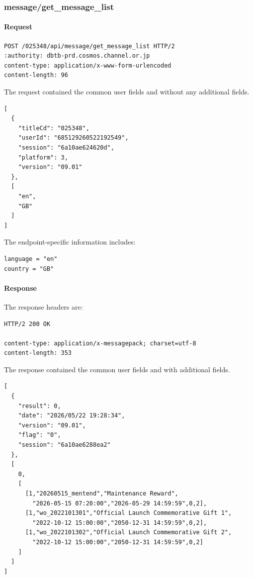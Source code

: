 \subsubsection{message/get\_message\_list}
\label{subsec:api_message_get_message_list}

\paragraph{Request}

\begin{lstlisting}
POST /025348/api/message/get_message_list HTTP/2
:authority: dbtb-prd.cosmos.channel.or.jp
content-type: application/x-www-form-urlencoded
content-length: 96
\end{lstlisting}

The request contained the common user fields and without any additional fields.

\begin{lstlisting}
[
  {
    "titleCd": "025348",
    "userId": "685129260522192549",
    "session": "6a10ae624620d",
    "platform": 3,
    "version": "09.01"
  },
  [
    "en",
    "GB"
  ]
]
\end{lstlisting}

The endpoint-specific information includes:

\begin{lstlisting}
language = "en"
country = "GB"
\end{lstlisting}

\newpage

\paragraph{Response}

The response headers are:

\begin{lstlisting}
HTTP/2 200 OK

content-type: application/x-messagepack; charset=utf-8
content-length: 353
\end{lstlisting}

The response contained the common user fields and with additional fields.

\begin{lstlisting}
[
  {
    "result": 0,
    "date": "2026/05/22 19:28:34",
    "version": "09.01",
    "flag": "0",
    "session": "6a10ae6288ea2"
  },
  [
    0,
    [
      [1,"20260515_mentend","Maintenance Reward",
        "2026-05-15 07:20:00","2026-05-29 14:59:59",0,2],
      [1,"wo_2022101301","Official Launch Commemorative Gift 1",
        "2022-10-12 15:00:00","2050-12-31 14:59:59",0,2],
      [1,"wo_2022101302","Official Launch Commemorative Gift 2",
        "2022-10-12 15:00:00","2050-12-31 14:59:59",0,2]
    ]
  ]
]
\end{lstlisting}

